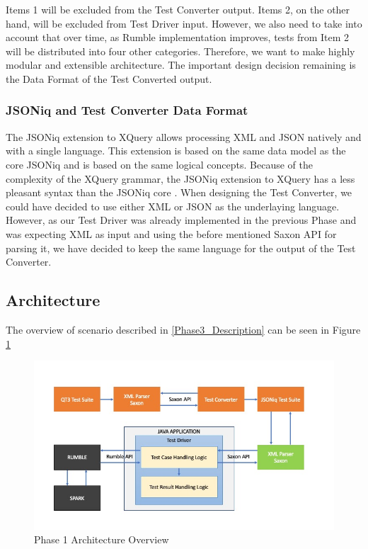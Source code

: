 Items 1 will be excluded from the Test Converter output. Items 2, on the other hand, will be excluded from Test Driver input. However, we also need to take into account that over time, as Rumble implementation improves, tests from Item 2 will be distributed into four other categories. Therefore, we want to make highly modular and extensible architecture. The important design decision remaining is the Data Format of the Test Converted output.

\subsubsection{JSONiq and Test Converter Data Format}
The JSONiq extension to XQuery allows processing XML and JSON natively and with a single language. This extension is based on the same data model as the core JSONiq and is based on the same logical concepts. Because of the complexity of the XQuery grammar, the JSONiq extension to XQuery has a less pleasant syntax than the JSONiq core \cite{JSONIQORG}. When designing the Test Converter, we could have decided to use either XML or JSON as the underlaying language. However, as our Test Driver was already implemented in the previous Phase and was expecting XML as input and using the before mentioned Saxon API for parsing it, we have decided to keep the same language for the output of the Test Converter. 

\subsection{Architecture}
The overview of scenario described in \ref{Phase3_Description} can be seen in Figure \ref{fig:Phase3_Architecture}
\begin{figure}[h!]
	\vspace*{-5mm}
	\includegraphics[width=\linewidth]{architecture_diagram_phase_3.jpg}
	\vspace*{-15mm}
	\caption{Phase 1 Architecture Overview}
	\label{fig:Phase3_Architecture}
\end{figure}

